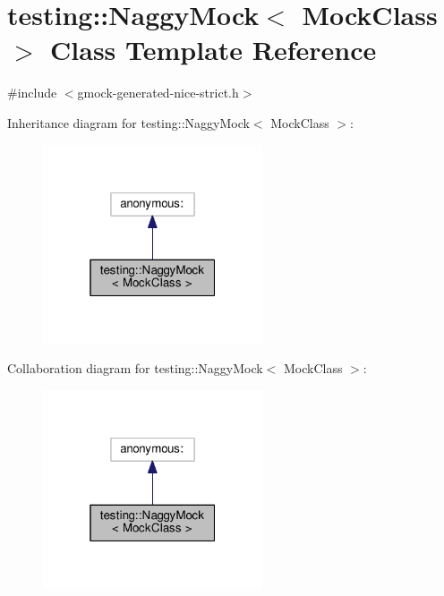 \hypertarget{classtesting_1_1NaggyMock}{}\section{testing\+:\+:Naggy\+Mock$<$ Mock\+Class $>$ Class Template Reference}
\label{classtesting_1_1NaggyMock}


{\ttfamily \#include $<$gmock-\/generated-\/nice-\/strict.\+h$>$}



Inheritance diagram for testing\+:\+:Naggy\+Mock$<$ Mock\+Class $>$\+:
\nopagebreak
\begin{figure}[H]
\begin{center}
\leavevmode
\includegraphics[width=184pt]{classtesting_1_1NaggyMock__inherit__graph}
\end{center}
\end{figure}


Collaboration diagram for testing\+:\+:Naggy\+Mock$<$ Mock\+Class $>$\+:
\nopagebreak
\begin{figure}[H]
\begin{center}
\leavevmode
\includegraphics[width=184pt]{classtesting_1_1NaggyMock__coll__graph}
\end{center}
\end{figure}
